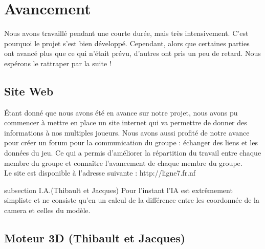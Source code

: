 \documentclass[12pt,a4paper]{article} %
\begin{document}
\section {Avancement}
Nous avons travaillé pendant une courte durée, mais très intensivement. C'est pourquoi le projet s'est bien développé. Cependant, alors que certaines parties ont avancé plus que ce qui n'était prévu, d'autres ont pris un peu de retard. Nous espérons le rattraper par la suite !
\subsection {Site Web}
Étant donné que nous avons été en avance sur notre projet, nous avons pu commencer à mettre en place un site internet qui va permettre de donner des informations à nos multiples joueurs. Nous avons aussi profité de notre avance pour créer un forum pour la communication du groupe : échanger des liens et les données du jeu. Ce qui a permis d'améliorer la répartition du travail entre chaque membre du groupe et connaître l'avancement de chaque membre du groupe.\\
Le site est disponible à  l'adresse suivante : http://ligne7.fr.nf
\newpage

subsection {I.A.(Thibault et Jacques)}
Pour l’instant l’IA est extrêmement simpliste et ne consiste qu’en un calcul de la différence entre les coordonnée de la camera et celles du modèle.


\subsection {Moteur 3D (Thibault et Jacques)}
\end{document}
